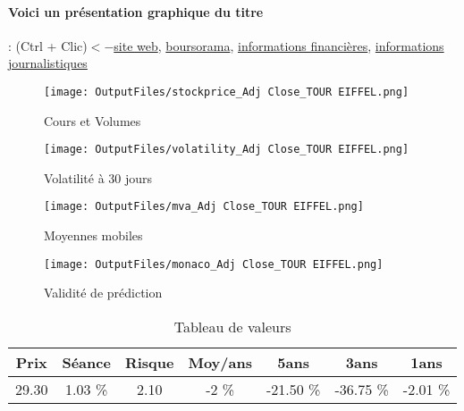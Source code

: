 \documentclass[11pt,a4paper]{report}%
\begin{document}
\paragraph{Voici un présentation graphique du titre} : (Ctrl + Clic)$<-$\href{https://societetoureiffel.com/chiffres-cles}{site web}, \href{https://www.boursorama.com/cours/1rPEIFF}{boursorama}, \href{https://www.qwant.com/?q=site:https:%2f%2fwww.easybourse.com%2faction-societe%2fTOUR-EIFFEL&t=web&client=ext-firefox-hp}{informations financières}, \href{https://bourse.lerevenu.com/cours-de-bourse/fiche-valeur-synthese/TOUR-EIFFEL/EIFF-FR}{informations journalistiques}
\begin{figure}[!htb]
   \begin{minipage}{0.5\textwidth}
     \centering
     \texttt{[image: OutputFiles/stockprice\_Adj Close\_TOUR EIFFEL.png]}
     \caption{Cours et Volumes}\label{Fig:price_TOUR EIFFEL}
   \end{minipage}\hfill
   \begin{minipage}{0.5\textwidth}
     \centering
     \texttt{[image: OutputFiles/volatility\_Adj Close\_TOUR EIFFEL.png]}
     \caption{Volatilité à 30 jours}\label{Fig:volat_TOUR EIFFEL}
   \end{minipage}
\end{figure}
\begin{figure}[!htb]
   \begin{minipage}{0.5\textwidth}
     \centering
     \texttt{[image: OutputFiles/mva\_Adj Close\_TOUR EIFFEL.png]}
     \caption{Moyennes mobiles}\label{Fig:mva_TOUR EIFFEL}
   \end{minipage}\hfill
   \begin{minipage}{0.5\textwidth}
     \centering
     \texttt{[image: OutputFiles/monaco\_Adj Close\_TOUR EIFFEL.png]}
     \caption{Validité de prédiction}\label{Fig:prediction_TOUR EIFFEL}
   \end{minipage}
\end{figure}

\begin{table}[H]
  \centering
    \begin{tabular}{|c|c|c|c|c|c|c|}
    \hline
    Prix & Séance & Risque  & Moy/ans & 5ans & 3ans & 1ans \\
    \hline
    29.30 &    1.03 \%    & 2.10 & -2 \% & -21.50 \% & -36.75 \% & -2.01 \% \\
    \hline
    \end{tabular}%
        \label{tab:table_TOUR EIFFEL}%
      \caption{Tableau de valeurs}
\end{table}%
\end{document}

